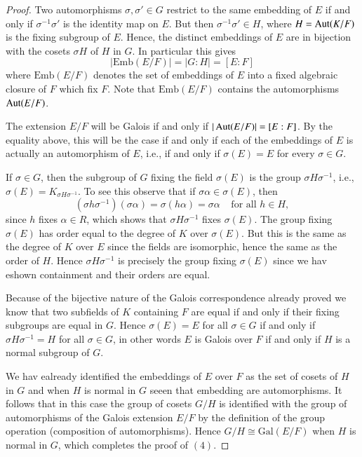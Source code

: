 \documentclass[12pt, a4paper, oneside, openright, titlepage]{book}
\begin{document}
\begin{proof}
    Two automorphisms $\sigma,\sigma' \in G$ restrict to the same embedding of $E$ if and only if $\sigma^{-1}\sigma'$ is the identity map on $E$. But then $\sigma^{-1}\sigma' \in H$, where $H = \operatorname{Aut}(K/F)$ is the fixing subgroup of $E$. Hence, the distinct embeddings of $E$ are in bijection with the cosets $\sigma H$ of $H$ in $G$. In particular this gives \begin{equation*}
        |\text{Emb}(E/F)| = |G:H| = [E:F]
    \end{equation*}
    where $\text{Emb}(E/F)$ denotes the set of embeddings of $E$ into a fixed algebraic closure of $F$ which fix $F$. Note that $\text{Emb}(E/F)$ contains the automorphisms $\operatorname{Aut}(E/F)$.

    The extension $E/F$ will be Galois if and only if $|\operatorname{Aut}(E/F)| = [E:F]$. By the equality above, this will be the case if and only if each of the embeddings of $E$ is actually an automorphism of $E$, i.e., if and only if $\sigma(E) = E$ for every $\sigma \in G$.

    If $\sigma \in G$, then the subgroup of $G$ fixing the field $\sigma(E)$ is the group $\sigma H\sigma^{-1}$, i.e., $\sigma(E) = K_{\sigma H\sigma^{-1}}$. To see this observe that if $\sigma \alpha \in \sigma(E)$, then $$(\sigma h\sigma^{-1})(\sigma\alpha) = \sigma(h\alpha) = \sigma \alpha\;\;\;\;\text{for all } h \in H,$$ since $h$ fixes $\alpha \in R$, which shows that $\sigma H \sigma^{-1}$ fixes $\sigma(E)$. The group fixing $\sigma(E)$ has order equal to the degree of $K$ over $\sigma(E)$. But this is the same as the degree of $K$ over $E$ since the fields are isomorphic, hence the same as the order of $H$. Hence $\sigma H\sigma^{-1}$ is precisely the group fixing $\sigma(E)$ since we hav eshown containment and their orders are equal.

    Because of the bijective nature of the Galois correspondence already proved we know that two subfields of $K$ containing $F$ are equal if and only if their fixing subgroups are equal in $G$. Hence $\sigma(E) = E$ for all $\sigma \in G$ if and only if $\sigma H \sigma^{-1} = H$ for all $\sigma \in G$, in other words $E$ is Galois over $F$ if and only if $H$ is a normal subgroup of $G$.

    We hav ealready identified the embeddings of $E$ over $F$ as the set of cosets of $H$ in $G$ and when $H$ is normal in $G$ seeen that embedding are automorphisms. It follows that in this case the group of cosets $G/H$ is identified with the group of automorphisms of the Galois extension $E/F$ by the definition of the group operation (composition of automorphisms). Hence $G/H\cong \text{Gal}(E/F)$ when $H$ is normal in $G$, which completes the proof of $(4)$.


\end{proof}
\end{document}
